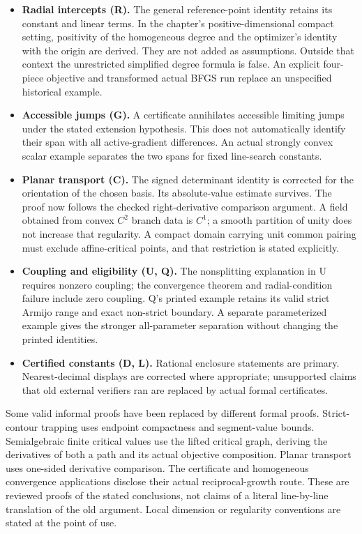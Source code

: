 \begin{itemize}
\item \textbf{Radial intercepts (R).} The general reference-point identity retains its constant and linear terms. In the chapter's positive-dimensional compact setting, positivity of the homogeneous degree and the optimizer's identity with the origin are derived. They are not added as assumptions. Outside that context the unrestricted simplified degree formula is false. An explicit four-piece objective and transformed actual BFGS run replace an unspecified historical example.
\item \textbf{Accessible jumps (G).} A certificate annihilates accessible limiting jumps under the stated extension hypothesis. This does not automatically identify their span with all active-gradient differences. An actual strongly convex scalar example separates the two spans for fixed line-search constants.
\item \textbf{Planar transport (C).} The signed determinant identity is corrected for the orientation of the chosen basis. Its absolute-value estimate survives. The proof now follows the checked right-derivative comparison argument. A field obtained from convex $C^2$ branch data is $C^1$; a smooth partition of unity does not increase that regularity. A compact domain carrying unit common pairing must exclude affine-critical points, and that restriction is stated explicitly.
\item \textbf{Coupling and eligibility (U, Q).} The nonsplitting explanation in U requires nonzero coupling; the convergence theorem and radial-condition failure include zero coupling. Q's printed example retains its valid strict Armijo range and exact non-strict boundary. A separate parameterized example gives the stronger all-parameter separation without changing the printed identities.
\item \textbf{Certified constants (D, L).} Rational enclosure statements are primary. Nearest-decimal displays are corrected where appropriate; unsupported claims that old external verifiers ran are replaced by actual formal certificates.
\end{itemize}

Some valid informal proofs have been replaced by different formal proofs. Strict-contour trapping uses endpoint compactness and segment-value bounds. Semialgebraic finite critical values use the lifted critical graph, deriving the derivatives of both a path and its actual objective composition. Planar transport uses one-sided derivative comparison. The certificate and homogeneous convergence applications disclose their actual reciprocal-growth route. These are reviewed proofs of the stated conclusions, not claims of a literal line-by-line translation of the old argument. Local dimension or regularity conventions are stated at the point of use.

